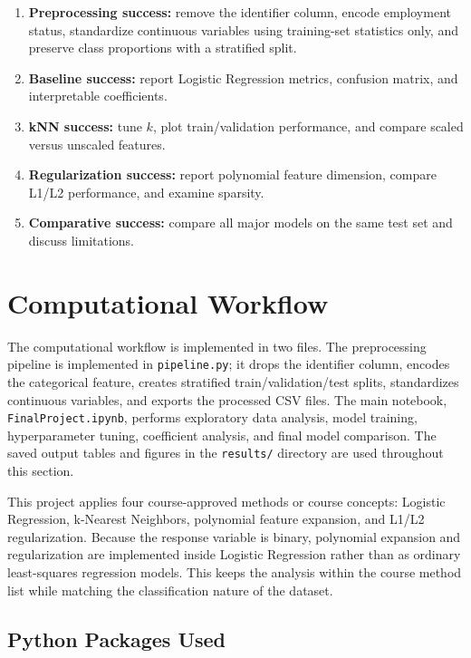 \documentclass[12pt]{article}
\begin{document}
\begin{enumerate}[label=(\roman*)]
    \item \textbf{Preprocessing success:} remove the identifier column, encode employment status, standardize continuous variables using training-set statistics only, and preserve class proportions with a stratified split.
    \item \textbf{Baseline success:} report Logistic Regression metrics, confusion matrix, and interpretable coefficients.
    \item \textbf{kNN success:} tune $k$, plot train/validation performance, and compare scaled versus unscaled features.
    \item \textbf{Regularization success:} report polynomial feature dimension, compare L1/L2 performance, and examine sparsity.
    \item \textbf{Comparative success:} compare all major models on the same test set and discuss limitations.
\end{enumerate}

\section{Computational Workflow}

The computational workflow is implemented in two files. The preprocessing pipeline is implemented in \texttt{pipeline.py}; it drops the identifier column, encodes the categorical feature, creates stratified train/validation/test splits, standardizes continuous variables, and exports the processed CSV files. The main notebook, \texttt{FinalProject.ipynb}, performs exploratory data analysis, model training, hyperparameter tuning, coefficient analysis, and final model comparison. The saved output tables and figures in the \texttt{results/} directory are used throughout this section.

This project applies four course-approved methods or course concepts: Logistic Regression, k-Nearest Neighbors, polynomial feature expansion, and L1/L2 regularization. Because the response variable is binary, polynomial expansion and regularization are implemented inside Logistic Regression rather than as ordinary least-squares regression models. This keeps the analysis within the course method list while matching the classification nature of the dataset.

\subsection{Python Packages Used}
\end{document}
